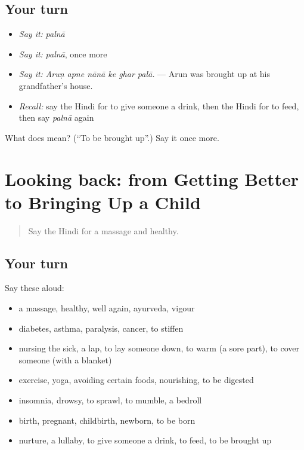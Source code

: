 \subsection*{Your turn}
\begin{itemize}
\raggedright
  \item \emph{Say it:} \emph{palnā}
  \item \emph{Say it:} \emph{palnā}, once more
  \item \emph{Say it:} \emph{Aruṇ apne nānā ke ghar palā.} — Arun was brought up at his grandfather's house.
  \item \emph{Recall:} say the Hindi for to give someone a drink, then the Hindi for to feed, then say \emph{palnā} again
\end{itemize}

\begin{tcolorbox}[breakable,colback=teal!4,colframe=teal!35!black,title={Before you move on}]
What does  mean? (\textquotedblleft{}To be brought up\textquotedblright{}.) Say it once more.
\end{tcolorbox}
\section[(dialogue)]{Looking back: from Getting Better to Bringing Up a Child}

\label{lesson:HI-R498-review-492-498}



\begin{quote}
Say the Hindi for a massage and healthy.
\end{quote}

\subsection*{Your turn}
Say these aloud:

\begin{itemize}
\raggedright
  \item a massage, healthy, well again, ayurveda, vigour
  \item diabetes, asthma, paralysis, cancer, to stiffen
  \item nursing the sick, a lap, to lay someone down, to warm (a sore part), to cover someone (with a blanket)
  \item exercise, yoga, avoiding certain foods, nourishing, to be digested
  \item insomnia, drowsy, to sprawl, to mumble, a bedroll
  \item birth, pregnant, childbirth, newborn, to be born
  \item nurture, a lullaby, to give someone a drink, to feed, to be brought up
\end{itemize}

